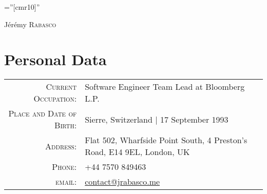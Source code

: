 \documentclass[a4paper,10pt]{article}
\begin{document}
\pagestyle{empty}
\font\fb=''[cmr10]''

\par{\centering
		{\Huge Jérémy \textsc{Rabasco}
	}\bigskip\par}

\section{Personal Data}

\begin{tabular}{rl}
	\textsc{Current Occupation:} & Software Engineer Team Lead at Bloomberg L.P.\\
	\textsc{Place and Date of Birth:} & Sierre, Switzerland | 17 September 1993 \\
	\textsc{Address:}   & Flat 502, Wharfside Point South, 4 Preston's Road, E14 9EL, London, UK \\
	\textsc{Phone:}     & +44 7570 849463\\
	\textsc{email:}     & \href{mailto:contact@jrabasco.me}{contact@jrabasco.me}
\end{tabular}

\end{document}
